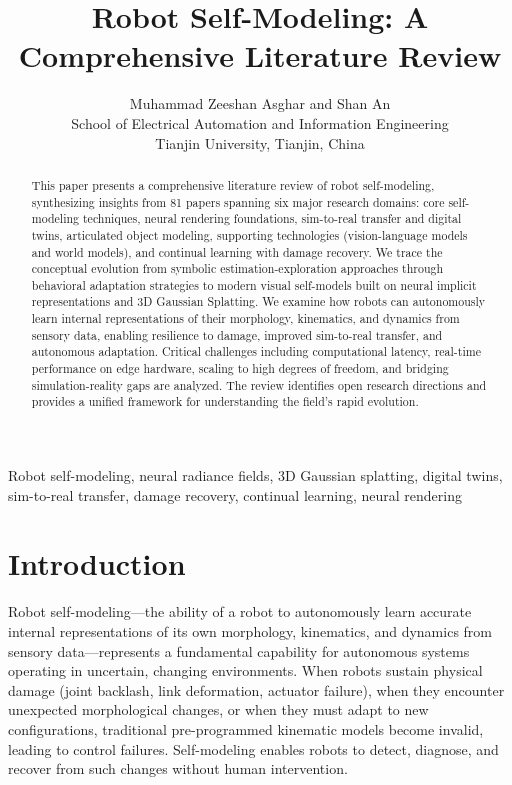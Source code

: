 \documentclass[journal]{IEEEtran}
\title{Robot Self-Modeling: A Comprehensive Literature Review}
\author{Muhammad Zeeshan Asghar and Shan An\\
School of Electrical Automation and Information Engineering\\
Tianjin University, Tianjin, China}
\begin{document}
\maketitle

\begin{abstract}
This paper presents a comprehensive literature review of robot self-modeling, synthesizing insights from 81 papers spanning six major research domains: core self-modeling techniques, neural rendering foundations, sim-to-real transfer and digital twins, articulated object modeling, supporting technologies (vision-language models and world models), and continual learning with damage recovery. We trace the conceptual evolution from symbolic estimation-exploration approaches through behavioral adaptation strategies to modern visual self-models built on neural implicit representations and 3D Gaussian Splatting. We examine how robots can autonomously learn internal representations of their morphology, kinematics, and dynamics from sensory data, enabling resilience to damage, improved sim-to-real transfer, and autonomous adaptation. Critical challenges including computational latency, real-time performance on edge hardware, scaling to high degrees of freedom, and bridging simulation-reality gaps are analyzed. The review identifies open research directions and provides a unified framework for understanding the field's rapid evolution.
\end{abstract}

\begin{IEEEkeywords}
Robot self-modeling, neural radiance fields, 3D Gaussian splatting, digital twins, sim-to-real transfer, damage recovery, continual learning, neural rendering
\end{IEEEkeywords}

\section{Introduction}

Robot self-modeling---the ability of a robot to autonomously learn accurate internal representations of its own morphology, kinematics, and dynamics from sensory data---represents a fundamental capability for autonomous systems operating in uncertain, changing environments. When robots sustain physical damage (joint backlash, link deformation, actuator failure), when they encounter unexpected morphological changes, or when they must adapt to new configurations, traditional pre-programmed kinematic models become invalid, leading to control failures. Self-modeling enables robots to detect, diagnose, and recover from such changes without human intervention.
\end{document}
